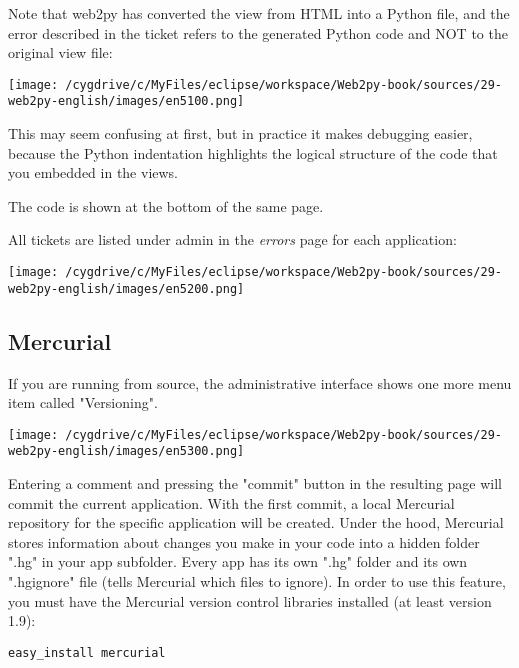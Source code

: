 \documentclass[justified,sixbynine,notoc]{tufte-book}
\def\inxx#1{\index{#1}}
\begin{document}
\begin{fullwidth}
Note that web2py has converted the view from HTML into a Python file, and the error described in the ticket refers to the generated Python code and NOT to the original view file:


\goodbreak\begin{center}\texttt{[image: /cygdrive/c/MyFiles/eclipse/workspace/Web2py-book/sources/29-web2py-english/images/en5100.png]}\end{center}


This may seem confusing at first, but in practice it makes debugging easier, because the Python indentation highlights the logical structure of the code that you embedded in the views.

The code is shown at the bottom of the same page.

All tickets are listed under admin in the {\it errors} page for each application:


\goodbreak\begin{center}\texttt{[image: /cygdrive/c/MyFiles/eclipse/workspace/Web2py-book/sources/29-web2py-english/images/en5200.png]}\end{center}


\goodbreak\subsection{Mercurial}

\inxx{Mercurial}

If you are running from source, the administrative interface shows one more menu item called "Versioning".


\goodbreak\begin{center}\texttt{[image: /cygdrive/c/MyFiles/eclipse/workspace/Web2py-book/sources/29-web2py-english/images/en5300.png]}\end{center}


Entering a comment and pressing the "commit" button in the resulting page will commit the current application. With the first commit, a local Mercurial repository for the specific
application will be created.
Under the hood, Mercurial stores information about changes you make in your code into a hidden folder ".hg" in your app subfolder. Every app has its own ".hg" folder and its own ".hgignore" file (tells Mercurial which files to ignore).
In order to use this feature, you must have the Mercurial version control libraries installed (at least version 1.9):

\begin{lstlisting}
easy_install mercurial
\end{lstlisting}


\end{fullwidth}
\end{document}
